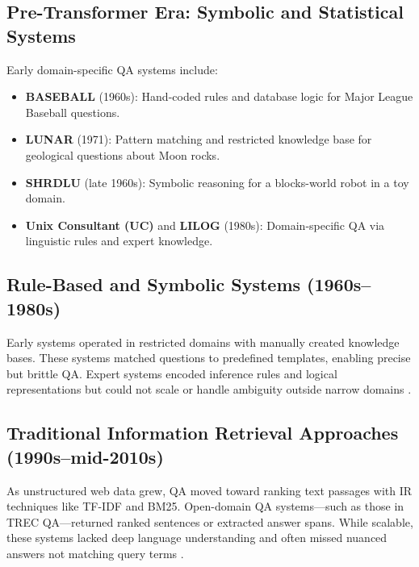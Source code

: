 \begin{spacing}{1.5}
\section{Pre-Transformer Era: Symbolic and Statistical Systems}

Early domain-specific QA systems include:
\begin{itemize}
    \item \textbf{BASEBALL} (1960s): Hand-coded rules and database logic for Major League Baseball questions.
    \item \textbf{LUNAR} (1971): Pattern matching and restricted knowledge base for geological questions about Moon rocks.
    \item \textbf{SHRDLU} (late 1960s): Symbolic reasoning for a blocks-world robot in a toy domain.
    \item \textbf{Unix Consultant (UC)} and \textbf{LILOG} (1980s): Domain-specific QA via linguistic rules and expert knowledge.
\end{itemize}
\citep{jurafsky_chapter_2024, antoniou_survey_2022}

\subsection{Rule-Based and Symbolic Systems (1960s–1980s)}
Early systems operated in restricted domains with manually created knowledge bases. These systems matched questions to predefined templates, enabling precise but brittle QA. Expert systems encoded inference rules and logical representations but could not scale or handle ambiguity outside narrow domains \citep{noauthor_question_2025,jurafsky_chapter_2024}.

\subsection{Traditional Information Retrieval Approaches (1990s–mid-2010s)}
As unstructured web data grew, QA moved toward ranking text passages with IR techniques like TF-IDF and BM25. Open-domain QA systems—such as those in TREC QA—returned ranked sentences or extracted answer spans. While scalable, these systems lacked deep language understanding and often missed nuanced answers not matching query terms \citep{antoniou_survey_2022, caballero_brief_2021}.


\end{spacing}
